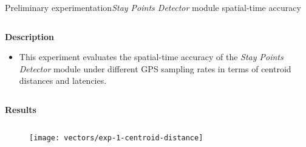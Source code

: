 \begin{frame}[noframenumbering]{Preliminary experimentation}{\emph{Stay Points Detector} module spatial-time accuracy}
\small

\begin{columns}
\begin{column}[T]{0.55\textwidth}

\begin{block}{\small \textbf{Description}}
\begin{itemize}
  \item This experiment evaluates the spatial-time accuracy of the \emph{Stay Points Detector} module under different GPS sampling rates in terms of centroid distances and latencies.
\end{itemize}
\end{block}

\end{column}
\begin{column}[T]{0.45\textwidth}
\begin{table}
\centering
\renewcommand{\arraystretch}{0.6}
\caption{Input parameters for the spatial-time accuracy of stay points experiment.}
\end{table}
\end{column}
\end{columns}

\vspace{-0.5cm}
\begin{block}{\small \textbf{Results}}
\begin{columns}
\begin{column}{0.65\textwidth}
\begin{figure}
  \centering
  \texttt{[image: vectors/exp-1-centroid-distance]}
\end{figure}
\end{column}
\begin{column}{0.3\textwidth}
\end{column}
\end{columns}

\end{block}
\end{frame}


